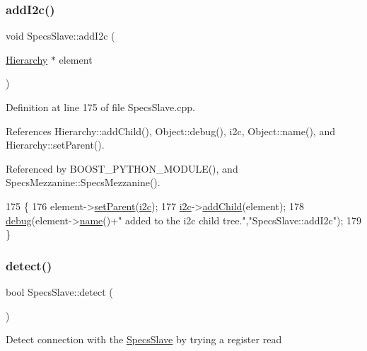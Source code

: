 \subsubsection{\texorpdfstring{add\+I2c()}{addI2c()}}
{\footnotesize\ttfamily void Specs\+Slave\+::add\+I2c (\begin{DoxyParamCaption}\item[{\hyperlink{classHierarchy}{Hierarchy} $\ast$}]{element }\end{DoxyParamCaption})}



Definition at line 175 of file Specs\+Slave.\+cpp.



References Hierarchy\+::add\+Child(), Object\+::debug(), i2c, Object\+::name(), and Hierarchy\+::set\+Parent().



Referenced by B\+O\+O\+S\+T\+\_\+\+P\+Y\+T\+H\+O\+N\+\_\+\+M\+O\+D\+U\+L\+E(), and Specs\+Mezzanine\+::\+Specs\+Mezzanine().


\begin{DoxyCode}
175                                          \{
176   element->\hyperlink{classHierarchy_a585ad1aeec16077a0e532ab8b4fc557b}{setParent}(\hyperlink{classSpecsSlave_a5210e5a45c381ee29a830b42119ec1d3}{i2c});
177   \hyperlink{classSpecsSlave_a5210e5a45c381ee29a830b42119ec1d3}{i2c}->\hyperlink{classHierarchy_ad677774ff38fcb257c04a3a10d471fac}{addChild}(element);
178   \hyperlink{classObject_aac010553f022165573714b7014a15f0d}{debug}(element->\hyperlink{classObject_a300f4c05dd468c7bb8b3c968868443c1}{name}()+\textcolor{stringliteral}{" added to the i2c child tree."},\textcolor{stringliteral}{"SpecsSlave::addI2c"});
179 \}
\end{DoxyCode}
\mbox{\label{classSpecsSlave_aa1411ca849bda04215518b08535185e2}} 
\subsubsection{\texorpdfstring{detect()}{detect()}}
{\footnotesize\ttfamily bool Specs\+Slave\+::detect (\begin{DoxyParamCaption}{ }\end{DoxyParamCaption})}

Detect connection with the \hyperlink{classSpecsSlave}{Specs\+Slave} by trying a register read

